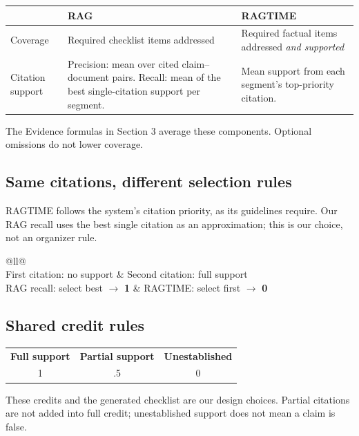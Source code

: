 \documentclass[11pt,letterpaper]{article}
\begin{document}
\begin{center}
\renewcommand{\arraystretch}{1.2}
\begin{tabularx}{\linewidth}{@{}lYY@{}}\toprule
 & \textbf{RAG} & \textbf{RAGTIME}\\\midrule
Coverage & Required checklist items addressed & Required factual items addressed \emph{and supported}\\[5pt]
Citation support & Precision: mean over cited claim--document pairs. Recall: mean of the best single-citation support per segment. & Mean support from each segment's top-priority citation.\\\bottomrule
\end{tabularx}
\end{center}
The Evidence formulas in Section 3 average these components. Optional omissions do not lower coverage.

\subsection*{Same citations, different selection rules}
RAGTIME follows the system's citation priority, as its guidelines require. Our RAG recall uses the best single citation as an approximation; this is our choice, not an organizer rule.

\begin{center}
\renewcommand{\arraystretch}{1.2}
\begin{tabular}{@{}ll@{}}\toprule
{}\\\midrule
First citation: no support & Second citation: full support\\\midrule
RAG recall: select best $\longrightarrow$ \textbf{1} & RAGTIME: select first $\longrightarrow$ \textbf{0}\\\bottomrule
\end{tabular}
\end{center}

\subsection*{Shared credit rules}
\begin{center}
\begin{tabular}{ccc}
\textcolor{decisiongreen}{\textbf{Full support}} & \textcolor{reviewamber}{\textbf{Partial support}} & \textbf{Unestablished}\\[3pt]
\Large 1 & \Large .5 & \Large 0
\end{tabular}
\end{center}
These credits and the generated checklist are our design choices. Partial citations are not added into full credit; unestablished support does not mean a claim is false.
\end{document}
